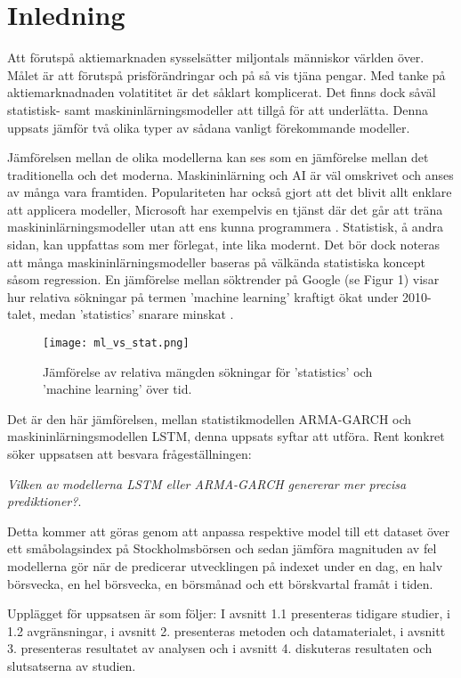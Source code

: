 \documentclass[12pt]{article}
\begin{document}
\section{Inledning}
Att förutspå aktiemarknaden sysselsätter miljontals människor världen över. Målet är att förutspå prisförändringar och på så vis tjäna pengar. Med tanke på aktiemarknadnaden volatititet är det såklart komplicerat. Det finns dock såväl statistisk- samt maskininlärningsmodeller att tillgå för att underlätta. Denna uppsats jämför två olika typer av sådana vanligt förekommande modeller. \par
Jämförelsen mellan de olika modellerna kan ses som en jämförelse mellan det traditionella och det moderna. Maskininlärning och AI är väl omskrivet och anses av många vara framtiden. Populariteten har också gjort att det blivit allt enklare att applicera modeller, Microsoft har exempelvis en tjänst där det går att träna maskininlärningsmodeller utan att ens kunna programmera \parencite{lobe}. Statistisk, å andra sidan, kan uppfattas som mer förlegat, inte lika modernt. Det bör dock noteras att många maskininlärningsmodeller baseras på välkända statistiska koncept såsom regression. En jämförelse mellan söktrender på Google (se Figur 1) visar hur relativa sökningar på termen 'machine learning' kraftigt ökat under 2010-talet, medan 'statistics' snarare minskat \parencite{trends_ml, trends_statistic}. 
\begin{figure}[h]
\caption{Jämförelse av relativa mängden sökningar för 'statistics' och 'machine learning' över tid.}
\texttt{[image: ml\_vs\_stat.png]}
\centering
\end{figure}
Det är den här jämförelsen, mellan statistikmodellen ARMA-GARCH och maskininlärningsmodellen LSTM, denna uppsats syftar att utföra. Rent konkret söker uppsatsen att besvara frågeställningen: \par 
\emph{Vilken av modellerna LSTM eller ARMA-GARCH genererar mer precisa prediktioner?}. \par
Detta kommer att göras genom att anpassa respektive model till ett dataset över ett småbolagsindex på Stockholmsbörsen och sedan jämföra magnituden av fel modellerna gör när de predicerar utvecklingen på indexet under en dag, en halv börsvecka, en hel börsvecka, en börsmånad och ett börskvartal framåt i tiden. \par 
Upplägget för uppsatsen är som följer: I avsnitt 1.1 presenteras tidigare studier, i 1.2 avgränsningar, i avsnitt 2. presenteras metoden och datamaterialet, i avsnitt 3. presenteras resultatet av analysen och i avsnitt 4. diskuteras resultaten och slutsatserna av studien. \par
\end{document}
